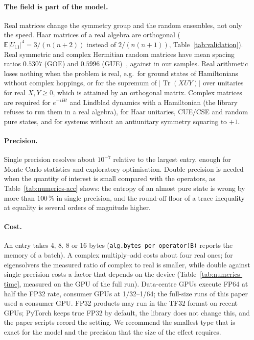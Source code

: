 \documentclass[11pt]{article}
\DeclareMathOperator{\Tr}{Tr}
\newcommand{\G}[3]{\IfFileExists{generated/#1.tex}{#2}{#3}}
\begin{document}
\paragraph{The field is part of the model.} Real matrices change the symmetry group and the random ensembles, not only
the speed. Haar matrices of a real algebra are orthogonal ($\mathbb E|U_{11}|^4=3/(n(n+2))$ instead of $2/(n(n+1))$,
Table~\ref{tab:validation}). Real symmetric and complex Hermitian random matrices have mean spacing ratios $0.5307$
(GOE) and $0.5996$ (GUE)~\cite[Table~I]{atas2013}, against \G{numerics}{\NumRGOE\ and \NumRGUE}{(not generated)} in our
samples. Real arithmetic loses nothing when the problem is real, e.g.\ for ground states of Hamiltonians without complex
hoppings, or for the supremum of $|\Tr(XUY)|$ over unitaries for real $X,Y\ge0$, which is attained by an orthogonal
matrix. Complex matrices are required for $e^{-iHt}$ and Lindblad dynamics with a Hamiltonian (the library refuses to
run them in a real algebra), for Haar unitaries, CUE/CSE and random pure states, and for systems without an antiunitary
symmetry squaring to $+1$.

\paragraph{Precision.} Single precision resolves about $10^{-7}$ relative to the largest entry, enough for Monte
Carlo statistics and exploratory optimisation. Double precision is needed when the quantity of interest is small
compared with the operators, as Table~\ref{tab:numerics-acc} shows: the entropy of an almost pure state is wrong by more
than $100\,\%$ in single precision, and the round-off floor of a trace inequality at equality is several orders of
magnitude higher.

\paragraph{Cost.} An entry takes 4, 8, 8 or 16 bytes (\texttt{alg.bytes\_per\_operator(B)} reports the memory of a
batch). A complex multiply--add costs about four real ones; for eigensolvers the measured ratio of complex to real is
smaller, while double against single precision costs a factor that depends on the device
(Table~\ref{tab:numerics-time}, measured on the GPU of the full run). Data-centre GPUs execute FP64 at half the FP32
rate, consumer GPUs at 1/32--1/64; the full-size runs of this paper used a consumer GPU. FP32 products may run in the
TF32 format on recent GPUs; PyTorch keeps true FP32 by default, the library does not change this, and the paper scripts
record the setting. We recommend the smallest type that is exact for the model and the precision that the size of the
effect requires.
\end{document}
